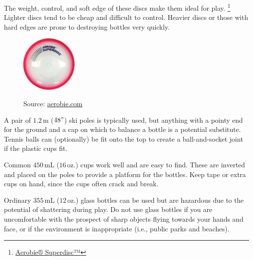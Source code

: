 \documentclass[11pt,letterpaper,twocolumn,english,DIV=calc]{scrartcl}
\begin{document}
\begin{description}[font=\large, leftmargin=0.5em]
	\item [{Aerobie® Superdisc™:}] 
		The weight, control, and soft edge of these discs make them ideal for play.%
		\footnote{\href{http://www.aerobie.com/products/superdisc.htm}{Aerobie® Superdisc™}} 
		Lighter discs tend to be cheap and difficult to control. 
		Heavier discs or those with hard edges are prone to destroying bottles very quickly.
		\begin{figure}[h]
			\centering{}
			\includegraphics[width=0.25\textwidth]{images/superdisc}{\footnotesize{}

			Source:
			\href{http://www.aerobie.com}{aerobie.com}}		
		\end{figure}
	\item [{Poles (2):}]
		A pair of $1.2\,\mbox{m}$ ($48"$) ski poles is typically used, but anything with a pointy end for the ground and a cap on which to balance a bottle is a potential substitute.
    Tennis balls can (optionally) be fit onto the top to create a ball-and-socket joint if the plastic cups fit. 
	\item [{Plastic cups (2+):}] 
		Common $450\,\mbox{mL}$ ($16\,\mbox{oz.}$) cups work well and are easy to find.
		These are inverted and placed on the poles to provide a platform for the bottles. 
		Keep tape or extra cups on hand, since the cups often crack and break.
	\vfill
	\item [{Empty Bottles (2):}] 
		Ordinary $355\,\mbox{mL}$ ($12\,\mbox{oz.}$) glass bottles can be used but are hazardous due to the potential of shattering during play.
		Do not use glass bottles if you are uncomfortable with the prospect of sharp objects flying towards your hands and face, or if the environment is inappropriate (i.e., public parks and beaches).


\end{description}
\end{document}
